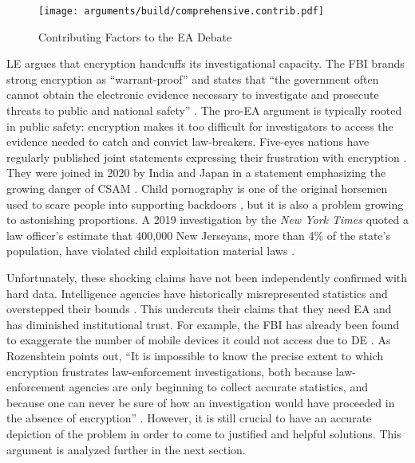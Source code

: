 \documentclass[conference]{IEEEtran}
\begin{document}
\begin{sidewaysfigure*}
  \centering
  \texttt{[image: arguments/build/comprehensive.contrib.pdf]}
  \caption{Contributing Factors to the EA Debate}
  \label{fig-args-contrib}
\end{sidewaysfigure*}

\Acl{LE} argues that encryption handcuffs its investigational capacity. The \ac{FBI} brands strong encryption as
``warrant-proof'' and states that ``the government often cannot obtain the electronic evidence necessary to investigate
and prosecute threats to public and national safety'' \cite{fbi_2020}. The pro-\ac{EA} argument is typically rooted in
public safety: encryption makes it too difficult for investigators to access the evidence needed to catch and convict
law-breakers. Five-eyes nations have regularly published joint statements expressing their frustration with encryption
\cite{ministerial_2018} \cite{goodale_2017}. They were joined in 2020 by India and Japan in a statement emphasizing the
growing danger of \ac{CSAM} \cite{intl_2020}. Child pornography is one of the original \ac{horsemen} used to scare
people into supporting backdoors \cite{schneier_scaring_2019}, but it is also a problem growing to astonishing
proportions. A 2019 investigation by the \textit{New York Times} quoted a law officer's estimate that 400,000 New
Jerseyans, more than 4\% of the state's population, have violated child exploitation material laws
\cite{keller_internet_2019}.

Unfortunately, these shocking claims have not been independently confirmed with hard data. Intelligence agencies have
historically misrepresented statistics and overstepped their bounds \cite{johnson_congressional_2004}
\cite{shamsi_2011}. This undercuts their claims that they need \ac{EA} and has diminished institutional trust. For
example, the \ac{FBI} has already been found to exaggerate the number of mobile devices it could not access due to
\acl{DE} \cite{devlin_2018}. As Rozenshtein points out, ``It is impossible to know the precise extent to which
encryption frustrates law-enforcement investigations, both because law-enforcement agencies are only beginning to
collect accurate statistics, and because one can never be sure of how an investigation would have proceeded in the
absence of encryption'' \cite{rozenshtein_wicked_2018}. However, it is still crucial to have an accurate depiction of
the problem in order to come to justified and helpful solutions. This argument is analyzed further in the next section.
\end{document}
